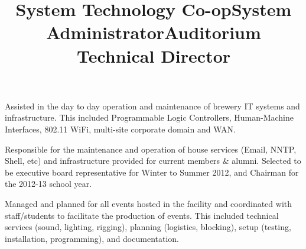 \begin{resume}
\title{System Technology Co-op}
\begin{position}
Assisted in the day to day operation and maintenance of brewery IT systems and infrastructure. This included Programmable Logic Controllers, Human-Machine Interfaces, 802.11 WiFi, multi-site corporate domain and WAN.
\end{position}

\title{System Administrator}
\begin{position}
Responsible for the maintenance and operation of house services (Email, NNTP, Shell, etc) and infrastructure provided for current members \& alumni. Selected to be executive board representative for Winter to Summer 2012, and Chairman for the 2012-13 school year.
\end{position}


\title{Auditorium Technical Director}
\begin{position}
Managed and planned for all events hosted in the facility and coordinated with staff/students to facilitate the production of events. This included technical services (sound, lighting, rigging), planning (logistics, blocking), setup (testing, installation, programming), and documentation. 
\end{position}


\begin{formatb}
  \\
  \body\\
\end{formatb}


\end{resume}
